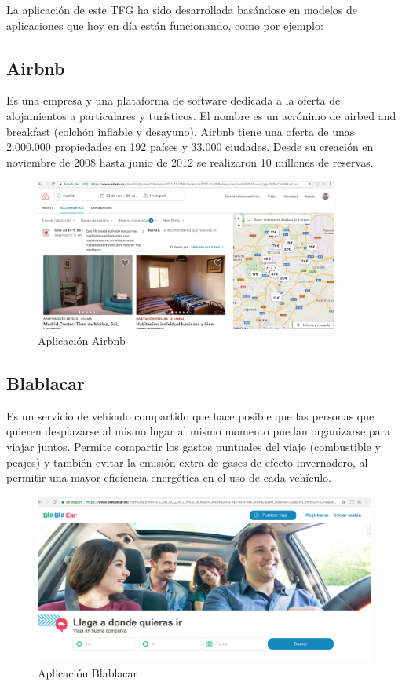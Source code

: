 La aplicación de este TFG ha sido desarrollada basándose en modelos de aplicaciones que hoy en día están funcionando, como por ejemplo:

\subsection*{Airbnb}

Es una empresa y una plataforma de software dedicada a la oferta de alojamientos a particulares y turísticos. El nombre es un acrónimo de airbed and breakfast (colchón inflable y desayuno). Airbnb tiene una oferta de unas 2.000.000 propiedades en 192 países y 33.000 ciudades. Desde su creación en noviembre de 2008 hasta junio de 2012 se realizaron 10 millones de reservas.

\begin{figure}[!h]
    \centering
    \includegraphics[width=100mm]{img/introduccion/airbnb.png}
    \caption{Aplicación Airbnb}
\end{figure}

\subsection*{Blablacar}

Es un servicio de vehículo compartido que hace posible que las personas que quieren desplazarse al mismo lugar al mismo momento puedan organizarse para viajar juntos. Permite compartir los gastos puntuales del viaje (combustible y peajes) y también evitar la emisión extra de gases de efecto invernadero, al permitir una mayor eficiencia energética en el uso de cada vehículo.

\begin{figure}[!h]
    \centering
    \includegraphics[width=120mm]{img/introduccion/blablacar.png}
    \caption{Aplicación Blablacar}
\end{figure}

